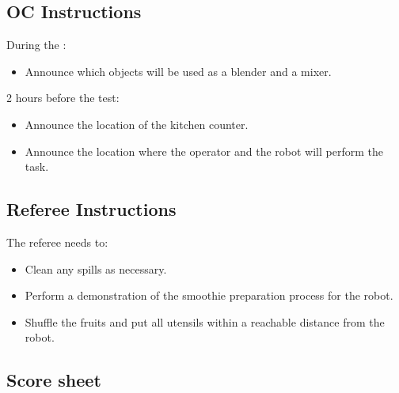 \subsection*{OC Instructions}
During the \SetupDays:
\begin{itemize}
	\item Announce which objects will be used as a blender and a mixer.
\end{itemize}
2 hours before the test:
\begin{itemize}
	\item Announce the location of the kitchen counter.
	\item Announce the location where the operator and the robot will perform the task.
\end{itemize}

\subsection*{Referee Instructions}

The referee needs to:
\begin{itemize}
	\item Clean any spills as necessary.
	\item Perform a demonstration of the smoothie preparation process for the robot.
	\item Shuffle the fruits and put all utensils within a reachable distance from the robot.
\end{itemize}

\subsection*{Score sheet}

